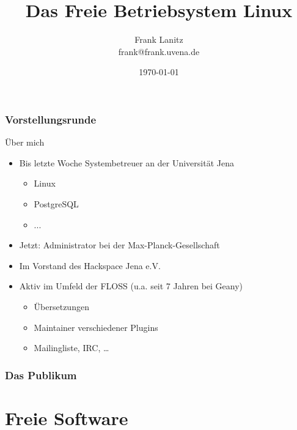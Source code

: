 \documentclass[compress]{beamer}
\title{Das Freie Betriebsystem Linux}
\author{Frank Lanitz \\ \tiny{frank@frank.uvena.de}}
\date{\today}
\begin{document}
\frame{\titlepage}
\begin{frame}
	\tableofcontents{}
\end{frame}
\begin{frame}
	\frametitle{Vorstellungsrunde}
	\begin{block}{Über mich}
		\begin{itemize}
			\item Bis letzte Woche Systembetreuer an der Universität Jena 
				\begin{itemize}
					\item Linux
					\item PostgreSQL
					\item ...
				\end{itemize}
			\item Jetzt: Administrator bei der Max-Planck-Gesellschaft
			\item Im Vorstand des Hackspace Jena e.V.
			\item Aktiv im Umfeld der FLOSS (u.a. seit 7 Jahren bei Geany)
			\begin{itemize}
				\item Übersetzungen
				\item Maintainer verschiedener Plugins
				\item Mailingliste, IRC, \dots
			\end{itemize}
		\end{itemize}
	\end{block}
\end{frame}
\begin{frame}
	\frametitle{Das Publikum}
\end{frame}
\begin{frame}
	\tableofcontents{}
\end{frame}
\section{Freie Software}
\end{document}
